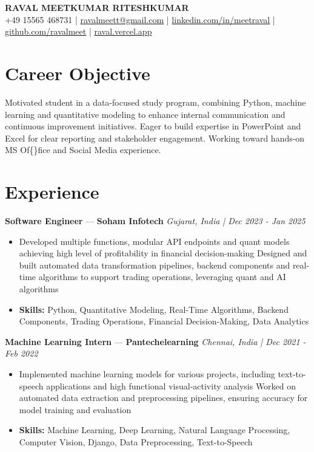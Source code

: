 \documentclass[a4paper,10pt]{article}
\begin{document}
\begin{center}
  {\Large\bfseries RAVAL MEETKUMAR RITESHKUMAR}\\[2pt]
  {\small +49 15565 468731 \;|\; \href{mailto:ravalmeett@gmail.com}{ravalmeett@gmail.com} \;|\; \href{https://www.linkedin.com/in/meetraval/}{linkedin.com/in/meetraval} \;|\; \href{https://github.com/ravalmeet}{github.com/ravalmeet} \;|\; \href{https://raval.vercel.app/}{raval.vercel.app}}
\end{center}
\vspace{-3pt}

\section*{Career Objective}
Motivated student in a data-focused study program, combining Python, machine learning and quantitative modeling to enhance internal communication and continuous improvement initiatives. Eager to build expertise in PowerPoint and Excel for clear reporting and stakeholder engagement. Working toward hands-on MS Of\{\}fice and Social Media experience.\par

\section*{Experience}
\textbf{Software Engineer} — \textbf{Soham Infotech} \hfill \textit{Gujarat, India \;|\; Dec 2023 - Jan 2025}\par
\vspace{1pt}
\begin{itemize}
  \item Developed multiple functions, modular API endpoints and quant models achieving high level of profitability in financial decision-making Designed and built automated data transformation pipelines, backend components and real-time algorithms to support trading operations, leveraging quant and AI algorithms
  \item \textbf{Skills:} Python, Quantitative Modeling, Real-Time Algorithms, Backend Components, Trading Operations, Financial Decision-Making, Data Analytics
\end{itemize}
\vspace{3pt}
\textbf{Machine Learning Intern} — \textbf{Pantechelearning} \hfill \textit{Chennai, India \;|\; Dec 2021 - Feb 2022}\par
\vspace{1pt}
\begin{itemize}
  \item Implemented machine learning models for various projects, including text-to-speech applications and high functional visual-activity analysis Worked on automated data extraction and preprocessing pipelines, ensuring accuracy for model training and evaluation
  \item \textbf{Skills:} Machine Learning, Deep Learning, Natural Language Processing, Computer Vision, Django, Data Preprocessing, Text-to-Speech
\end{itemize}
\end{document}
